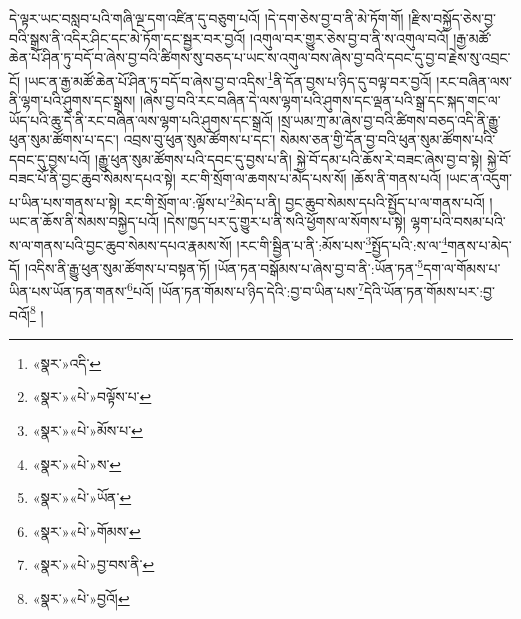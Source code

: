 དེ་ལྟར་ཡང་བསླབ་པའི་གཞི་ལྔ་དག་འཛིན་དུ་བཅུག་པའོ། །དེ་དག་ཅེས་བྱ་བ་ནི་མེ་ཏོག་གོ། །རྫིས་བསྐྱོད་ཅེས་བྱ་བའི་སྒྲས་ནི་འདིར་ཤིང་དང་མེ་ཏོག་དང་སྦྱར་བར་བྱའོ། །འགུལ་བར་གྱུར་ཅེས་བྱ་བ་ནི་ས་འགུལ་བའོ། །རྒྱ་མཚོ་ཆེན་པོ་ཤིན་ཏུ་བདོ་བ་ཞེས་བྱ་བའི་ཚིགས་སུ་བཅད་པ་ཡང་ས་འགུལ་བས་ཞེས་བྱ་བའི་དབང་དུ་བྱ་བ་རྗེས་སུ་འབྲང་ངོ། །ཡང་ན་རྒྱ་མཚོ་ཆེན་པོ་ཤིན་ཏུ་བདོ་བ་ཞེས་བྱ་བ་འདིས་\footnote{«སྣར་»འདི་}ནི་དོན་བྱས་པ་ཉིད་དུ་བལྟ་བར་བྱའོ། །རང་བཞིན་ལས་ནི་ལྷག་པའི་ཤུགས་དང་སྒྲས། །ཞེས་བྱ་བའི་རང་བཞིན་དེ་ལས་ལྷག་པའི་ཤུགས་དང་ལྡན་པའི་སྒྲ་དང་སྐད་གང་ལ་ཡོད་པའི་ཆུ་དེ་ནི་རང་བཞིན་ལས་ལྷག་པའི་ཤུགས་དང་སྒྲའོ། །སྲ་ཡམ་ཀྲ་མ་ཞེས་བྱ་བའི་ཚིགས་བཅད་འདི་ནི་རྒྱུ་ཕུན་སུམ་ཚོགས་པ་དང་། འབྲས་བུ་ཕུན་སུམ་ཚོགས་པ་དང་། སེམས་ཅན་གྱི་དོན་བྱ་བའི་ཕུན་སུམ་ཚོགས་པའི་དབང་དུ་བྱས་པའོ། །རྒྱུ་ཕུན་སུམ་ཚོགས་པའི་དབང་དུ་བྱས་པ་ནི། སྐྱེ་བོ་དམ་པའི་ཆོས་རེ་བཟང་ཞེས་བྱ་བ་སྟེ། སྐྱེ་བོ་བཟང་པོ་ནི་བྱང་ཆུབ་སེམས་དཔའ་སྟེ། རང་གི་སྲོག་ལ་ཆགས་པ་མེད་པས་སོ། །ཆོས་ནི་གནས་པའོ། །ཡང་ན་འདུག་པ་ཡིན་པས་གནས་པ་སྟེ། རང་གི་སྲོག་ལ་:ལྟོས་པ་\footnote{«སྣར་»«པེ་»བལྟོས་པ་}མེད་པ་ནི། བྱང་ཆུབ་སེམས་དཔའི་སྤྱོད་པ་ལ་གནས་པའོ། །ཡང་ན་ཆོས་ནི་སེམས་བསྐྱེད་པའོ། །དེས་ཁྱད་པར་དུ་གྱུར་པ་ནི་སའི་ཕྱོགས་ལ་སོགས་པ་སྟེ། ལྷག་པའི་བསམ་པའི་ས་ལ་གནས་པའི་བྱང་ཆུབ་སེམས་དཔའ་རྣམས་སོ། །རང་གི་སྦྱིན་པ་ནི་:མོས་པས་\footnote{«སྣར་»«པེ་»མོས་པ་}སྤྱོད་པའི་:ས་ལ་\footnote{«སྣར་»«པེ་»ས་}གནས་པ་མེད་དོ། །འདིས་ནི་རྒྱུ་ཕུན་སུམ་ཚོགས་པ་བསྟན་ཏོ། །ཡོན་ཏན་བསྒོམས་པ་ཞེས་བྱ་བ་ནི་:ཡོན་ཏན་\footnote{«སྣར་»«པེ་»ཡོན་}དག་ལ་གོམས་པ་ཡིན་པས་ཡོན་ཏན་གནས་\footnote{«སྣར་»«པེ་»གོམས་}པའོ། །ཡོན་ཏན་གོམས་པ་ཉིད་དེའི་:བྱ་བ་ཡིན་པས་\footnote{«སྣར་»«པེ་»བྱ་བས་ནི་}དེའི་ཡོན་ཏན་གོམས་པར་:བྱ་བའོ།\footnote{«སྣར་»«པེ་»བྱའོ།} །
